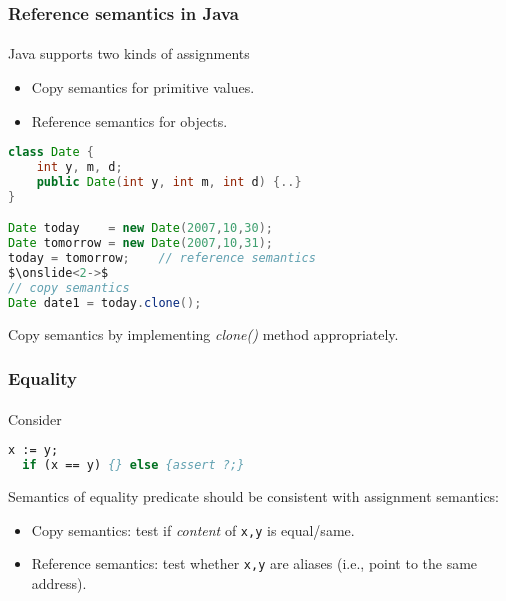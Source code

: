 \documentclass{beamer}
\begin{document}
\begin{frame}[fragile]
\frametitle{Reference semantics in Java}
\framesubtitle{}
Java supports two kinds of assignments 
\begin{itemize}
\item Copy semantics for primitive values.
\item Reference semantics for objects. 
\end{itemize}

\begin{lstlisting}[language=Java, columns=flexible, escapechar=\$]
class Date {
    int y, m, d;
    public Date(int y, int m, int d) {..}
}

Date today    = new Date(2007,10,30);
Date tomorrow = new Date(2007,10,31);
today = tomorrow;    // reference semantics
$\onslide<2->$
// copy semantics 
Date date1 = today.clone();
\end{lstlisting}

Copy semantics by implementing \textit{clone()} method appropriately.
\end{frame}



\begin{frame}[fragile]
\frametitle{Equality}
\framesubtitle{}
Consider
\begin{lstlisting}[language=Pascal, basicstyle=\ttfamily, columns=flexible]
  x := y;
  if (x == y) {} else {assert ?;} 
\end{lstlisting}

\pause\bigskip

Semantics of equality predicate should be consistent with assignment semantics:
\begin{itemize}
\item<+-> Copy semantics: test if \emph{content} of \texttt{x,y} is equal/same.
\item<+-> Reference semantics: test whether \texttt{x,y} are aliases (i.e., point
to the same address).
\end{itemize}
\end{frame}
\end{document}

